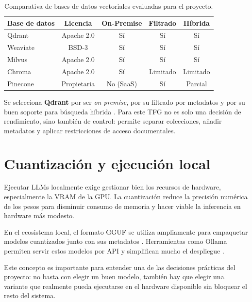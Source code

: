 \begin{table}[H]
\centering
\caption{Comparativa de bases de datos vectoriales evaluadas para el proyecto.}
\label{tab:vectordb-comparativa}
\begin{tabular}{lcccc}
\toprule
\textbf{Base de datos} & \textbf{Licencia} & \textbf{On-Premise} & \textbf{Filtrado} & \textbf{Híbrida} \\
\midrule
Qdrant   & Apache 2.0 & Sí & Sí & Sí \\
Weaviate & BSD-3 & Sí & Sí & Sí \\
Milvus   & Apache 2.0 & Sí & Sí & Sí \\
Chroma   & Apache 2.0 & Sí & Limitado & Limitado \\
Pinecone & Propietaria & No (SaaS) & Sí & Parcial \\
\bottomrule
\end{tabular}
\end{table}

Se selecciona \textbf{Qdrant} por ser \textit{on-premise}, por su filtrado por metadatos y por su buen soporte para búsqueda híbrida \cite{qdrantHybridTutorial,qdrantSparseVectors}. Para este TFG no es solo una decisión de rendimiento, sino también de control: permite separar colecciones, añadir metadatos y aplicar restricciones de acceso documentales.

\section{Cuantización y ejecución local}
\label{sec:cuantizacion}

Ejecutar LLMs localmente exige gestionar bien los recursos de hardware, especialmente la VRAM de la GPU. La cuantización reduce la precisión numérica de los pesos para disminuir consumo de memoria y hacer viable la inferencia en hardware más modesto.

En el ecosistema local, el formato GGUF se utiliza ampliamente para empaquetar modelos cuantizados junto con sus metadatos \cite{ggmlGgufSpec,hfGgufDocs}. Herramientas como Ollama permiten servir estos modelos por API y simplifican mucho el despliegue \cite{ollamaImportGguf}.

Este concepto es importante para entender una de las decisiones prácticas del proyecto: no basta con elegir un buen modelo, también hay que elegir una variante que realmente pueda ejecutarse en el hardware disponible sin bloquear el resto del sistema.

